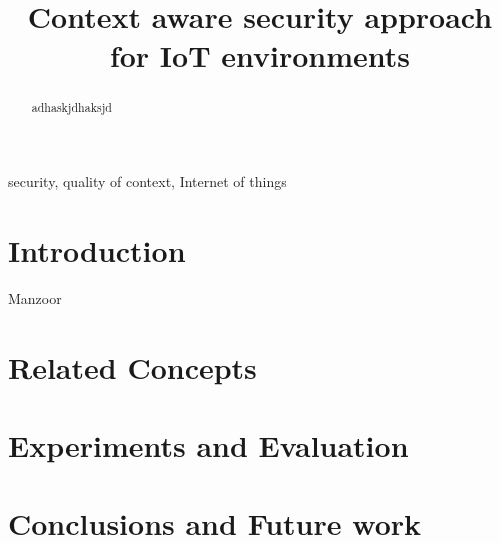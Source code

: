 \documentclass[letterpaper,conference]{IEEEtran}
\begin{document}
\title{Context aware security approach for IoT environments}
\author{
}

\maketitle

\begin{abstract}
adhaskjdhaksjd \cite{whitman2011principles}
\end{abstract}

\begin{IEEEkeywords}
security, quality of context, Internet of things
\end{IEEEkeywords}

\IEEEpeerreviewmaketitle

\section{Introduction}

Manzoor \cite{manzoor2009quality}

\section{Related Concepts} 
 
\section{Experiments and Evaluation}

\section{Conclusions and Future work}



\end{document}
